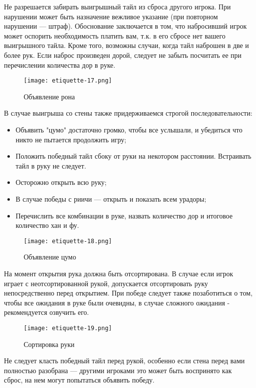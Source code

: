 Не разрешается забирать выигрышный тайл из сброса другого игрока. При нарушении может быть назначение вежливое указание (при повторном нарушении --- штраф). Обоснование заключается в том, что набросивший игрок может оспорить необходимость платить вам, т.к. в его сбросе нет вашего выигрышного тайла. Кроме того, возможны случаи, когда тайл наброшен в две и более рук. Если наброс произведен дорой, следует не забыть посчитать ее при перечислении количества дор в руке.

\begin{figure}[H]
	\centering
	\texttt{[image: etiquette-17.png]}
	\caption{Объявление рона}
\end{figure}

В случае выигрыша со стены также придерживаемся строгой последовательности:

\begin{itemize}
	\item Объявить "цумо" достаточно громко, чтобы все услышали, и убедиться что никто не пытается продолжить игру;
	\item Положить победный тайл сбоку от руки на некотором расстоянии. Встраивать тайл в руку не следует.
	\item Осторожно открыть всю руку;
	\item В случае победы с риичи --- открыть и показать всем урадоры;
	\item Перечислить все комбинации в руке, назвать количество дор и итоговое количество хан и фу.
\end{itemize}

\begin{figure}[H]
	\centering
	\texttt{[image: etiquette-18.png]}
	\caption{Объявление цумо}
\end{figure}

На момент открытия рука должна быть отсортирована. В случае если игрок играет с неотсортированной рукой, допускается отсортировать руку непосредственно перед открытием. При победе следует также позаботиться о том, чтобы все ожидания в руке были очевидны, в случае сложного ожидания - рекомендуется озвучить его.

\begin{figure}[H]
	\centering
	\texttt{[image: etiquette-19.png]}
	\caption{Сортировка руки}
\end{figure}

Не следует класть победный тайл перед рукой, особенно если стена перед вами полностью разобрана --- другими игроками это может быть воспринято как сброс, на нем могут попытаться объявить победу.

